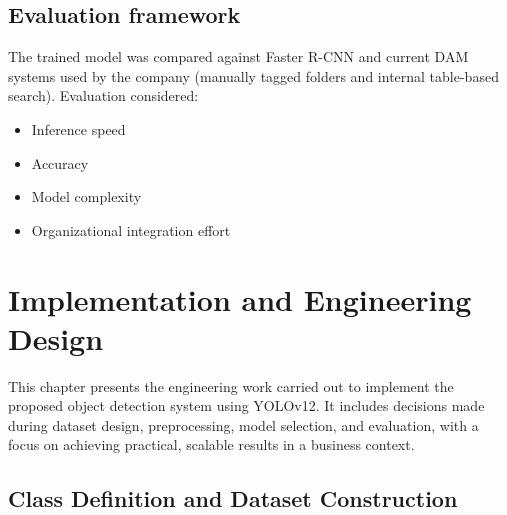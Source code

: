 \documentclass[a4paper,10pt,twocolumn]{article}
\numberwithin{figure}{section}
\numberwithin{table}{section}
\begin{document}
\subsection{Evaluation framework}
The trained model was compared against 
Faster R-CNN and current DAM systems used 
by the company (manually tagged folders and 
internal table-based search). Evaluation considered:

\begin{itemize} 
    \item Inference speed
    \item Accuracy
    \item Model complexity
    \item Organizational integration effort
\end{itemize} 



\section{ Implementation and Engineering Design}

This chapter presents the engineering work carried out to 
implement the proposed object detection system using YOLOv12. 
It includes decisions made during dataset design, preprocessing, 
model selection, and evaluation, with a focus on achieving practical, 
scalable results in a business context.

\subsection{Class Definition and Dataset Construction}


\end{document}
